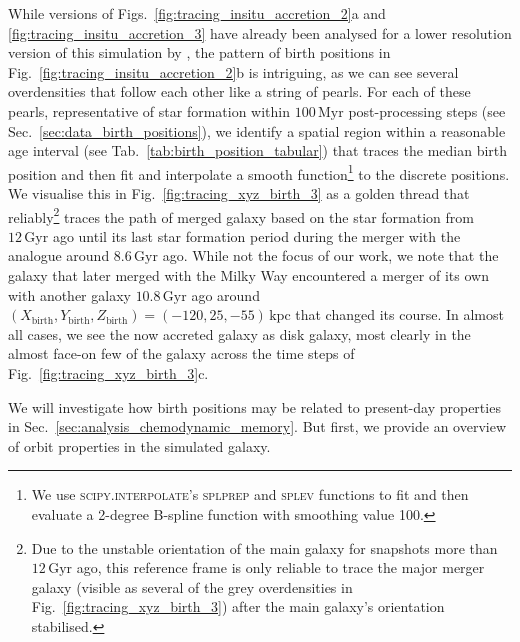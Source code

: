 \documentclass[fleqn,usenatbib]{mnras}
\begin{document}
While versions of Figs.~\ref{fig:tracing_insitu_accretion_2}a and \ref{fig:tracing_insitu_accretion_3} have already been analysed for a lower resolution version of this simulation by \citet{Buder2024}, the pattern of birth positions in Fig.~\ref{fig:tracing_insitu_accretion_2}b is intriguing, as we can see several overdensities that follow each other like a string of pearls.
For each of these pearls, representative of star formation within $100\,\mathrm{Myr}$ post-processing steps (see Sec.~\ref{sec:data_birth_positions}), we identify a spatial region within a reasonable age interval (see Tab.~\ref{tab:birth_position_tabular}) that traces the median birth position and then fit and interpolate a smooth function\footnote{We use \textsc{scipy.interpolate}'s \textsc{splprep} and \textsc{splev} functions \citep{Scipy} to fit and then evaluate a 2-degree B-spline function with smoothing value 100.} to the discrete positions.  We visualise this in Fig.~\ref{fig:tracing_xyz_birth_3} as a golden thread that reliably\footnote{Due to the unstable orientation of the main galaxy for snapshots more than $12\,\mathrm{Gyr}$ ago, this reference frame is only reliable to trace the major merger galaxy (visible as several of the grey overdensities in Fig.~\ref{fig:tracing_xyz_birth_3}) after the main galaxy's orientation stabilised.} traces the path of merged galaxy based on the star formation from $12\,\mathrm{Gyr}$ ago until its last star formation period during the merger with the analogue around $8.6\,\mathrm{Gyr}$ ago. While not the focus of our work, we note that the galaxy that later merged with the Milky Way encountered a merger of its own with another galaxy $10.8\,\mathrm{Gyr}$ ago around $(X_\mathrm{birth},Y_\mathrm{birth},Z_\mathrm{birth}) = (-120,25,-55)\,\mathrm{kpc}$ that changed its course. In almost all cases, we see the now accreted galaxy as disk galaxy, most clearly in the almost face-on few of the galaxy across the time steps of Fig.~\ref{fig:tracing_xyz_birth_3}c.

We will investigate how birth positions may be related to present-day properties in Sec.~\ref{sec:analysis_chemodynamic_memory}. But first, we provide an overview of orbit properties in the simulated galaxy. %

\end{document}
